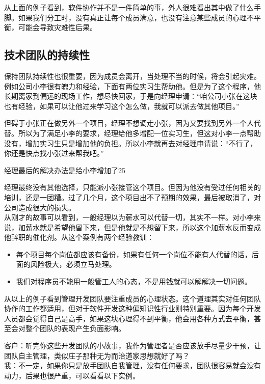 从上面的例子看到，软件协作并不是一件简单的事，外人很难看出其中做了什么手脚。如果我们分工时，没有真正让每个成员满意，也没有注意某些成员的心理不平衡，可能会导致灾难性后果。

\hypertarget{ux6280ux672fux56e2ux961fux7684ux6301ux7eedux6027}{%
\subsection{技术团队的持续性}\label{ux6280ux672fux56e2ux961fux7684ux6301ux7eedux6027}}

保持团队持续性也很重要，因为成员会离开，当处理不当的时候，将会引起灾难。\\
例如公司小李很有魄力和经验，下面有两位实习生帮助他。但是为了这个程序，他长期离家到偏远的现场工作，想尽快回家，于是向经理申请：“咱公司小张在这块也有经验，如果可以让他过来学习这个怎么做，我就可以派去做其他项目。”

但碍于小张正在做另外一个项目，经理不想调走小张，因为又要找到另外一个人代替。所以为了满足小李的要求，经理给他多增配一位实习生，但这对小李一点帮助没有，增加实习生只是增加他的负担。所以小李就再去对经理申请说：``不行了，你还是快点找小张过来帮我吧。''

经理最后的解决办法是给小李增加了25%

经理最终没有其他选择，只能派小张接管这个项目。但因为他没有受过任何相关的培训，还是一团糟。过了几个月，这个项目出不了预期的效果，最后被取消了，对公司造成很大的损失。\\
从刚才的故事可以看到，一般经理以为薪水可以代替一切，其实不一样。对小李来说，加薪水就是希望他留下来，但是他就是不想留下来，所以这个加薪水反而变成他辞职的催化剂。从这个案例有两个经验教训：

\begin{itemize}
\tightlist
\item
  每个项目每个岗位都应该有备份，如果有任何一个岗位不能有人代替的话，后面的风险极大，必须立马处理。
\item
  我们对程序员不能用一般管工人的心态，不是用钱就可以解解决一切问题。\\
\end{itemize}

从以上的例子看到管理开发团队要注重成员的心理状态。这个道理其实对任何团队协作的工作都适用，但对于软件开发这种偏知识性行业则特别重要。因为每个开发人员都会觉得自己是高手，如果这块心理得不到平衡，他会用各种方式去平衡，甚至会对整个团队的表现产生负面影响。

客户：听完你这些开发团队的小故事，我作为管理者是否应该放手尽量少干预，让团队自主管理，类似庄子那种无为而治道家思想就好了吗？\\
我：不一定，如果你只是放手团队自我管理，没有任何要求，团队很容易就会没有动力，后果也很严重，可以看看以下实例。\\

